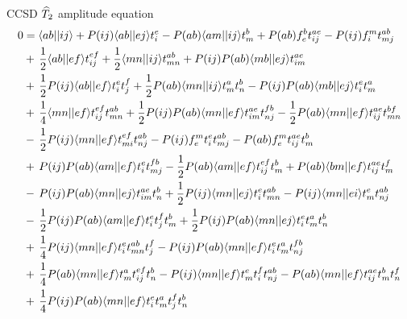 \begin{frame}{CCSD $\widehat{T}_2$ amplitude equation }
    \scriptsize
\begin{align*}
    0 &= 
        \langle ab| |ij\rangle
        + P(ij) \langle ab||ej\rangle t_i^e
        - P(ab) \langle am| |ij\rangle t_m^b
        + P(ab) f_{e}^b t_{ij}^{ae}
        - P(ij) f_{i}^m t_{mj}^{ab} \notag \\
        & + \, \frac{1}{2} \langle ab||ef\rangle t_{ij}^{ef}
        + \frac{1}{2} \langle mn||ij\rangle t_{mn}^{ab}
        + P(ij) P(ab) \langle mb||ej\rangle t_{im}^{ae} \notag \\
        & + \, \frac{1}{2} P(ij) \langle ab||ef\rangle t_i^e t_j^f
        + \frac{1}{2} P(ab) \langle mn||ij\rangle t_m^a t_n^b
        - P(ij) P(ab) \langle mb||ej\rangle t_i^e t_m^a \notag \\
        & + \, \frac{1}{4} \langle mn||ef\rangle t_{ij}^{ef} t_{mn}^{ab}
        + \frac{1}{2} P(ij) P(ab) \langle mn||ef\rangle t_{im}^{ae} t_{nj}^{fb}
        - \frac{1}{2} P(ab) \langle mn||ef\rangle t_{ij}^{ae} t_{mn}^{bf} \notag \\
        & - \, \frac{1}{2} P(ij) \langle mn||ef\rangle t_{mi}^{ef} t_{nj}^{ab}
        - P(ij) f_{e}^m t_i^e t_{mj}^{ab}
        - P(ab) f_{e}^m t_{ij}^{ae} t_m^b \notag \\
        & + \, P(ij) P(ab) \langle am||ef\rangle t_i^e t_{mj}^{fb}
        - \frac{1}{2} P(ab) \langle am||ef\rangle t_{ij}^{ef} t_m^b
        + P(ab) \langle bm||ef\rangle t_{ij}^{ae} t_m^f \notag \\
        & - \, P(ij) P(ab) \langle mn| |ej\rangle t_{im}^{ae} t_n^b
        + \frac{1}{2} P(ij) \langle mn||ej\rangle t_i^e t_{mn}^{ab}
        -P(ij) \langle mn||ei\rangle t_m^e t_{nj}^{ab} \notag \\
        & - \, \frac{1}{2} P(ij) P(ab) \langle am||ef\rangle t_i^e t_j^f t_m^b
        + \frac{1}{2} P(ij) P(ab) \langle mn||ej\rangle t_i^e t_m^a t_n^b \notag \\
        & + \, \frac{1}{4} P(ij) \langle mn||ef\rangle t_i^e t_{mn}^{ab} t_j^f
        - P(ij) P(ab) \langle mn||ef\rangle t_i^e t_m^a t_{nj}^{fb} \notag \\
        & + \, \frac{1}{4} P(ab) \langle mn||ef\rangle t_m^a t_{ij}^{ef} t_n^b
        - P(ij) \langle mn||ef\rangle t_m^e t_i^f t_{nj}^{ab}
        - P(ab) \langle mn||ef\rangle t_{ij}^{ae} t_m^b t_n^f \notag \\
        & + \, \frac{1}{4} P(ij) P(ab) \langle mn||ef\rangle t_i^e t_m^a t_j^f t_n^b \notag \\
\end{align*}

\end{frame}

    
